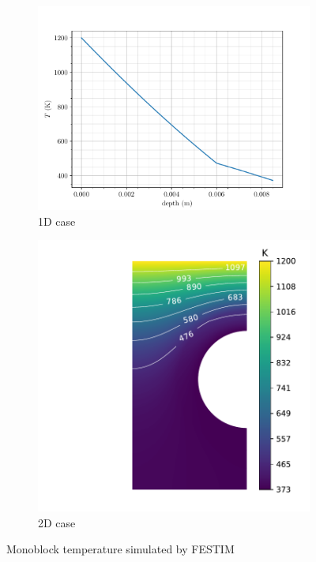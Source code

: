 \begin{figure}
    \centering
    \begin{subfigure}{0.5\linewidth}                              
        \includegraphics[width=\linewidth]{Figures/Chapter3/monoblocks/interface_condition/iter case/temperature_1D.pdf}
        \caption{1D case}
        \label{fig: 1D temperature}
    \end{subfigure}%
    \begin{subfigure}{0.5\linewidth}                          
        \includegraphics[width=\linewidth]{Figures/Chapter3/monoblocks/interface_condition/iter case/temperature_field_2d.pdf}
        \caption{2D case}
        \label{fig: 2D temperature}
    \end{subfigure}%
    \caption{Monoblock temperature simulated by FESTIM}
    \label{fig: temperature}
\end{figure}

